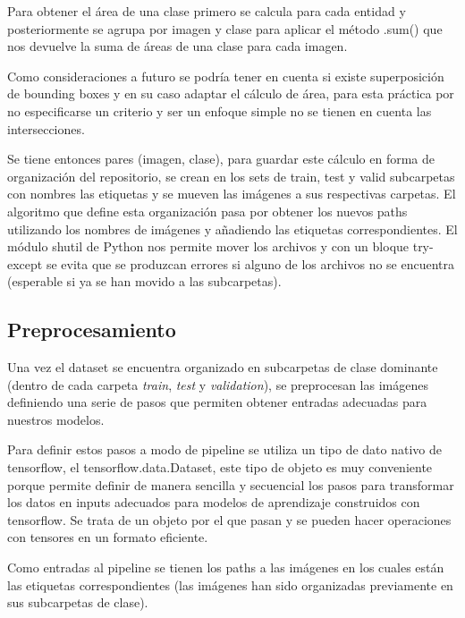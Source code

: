 \quad  

\noindent
Para obtener el área de una clase primero se calcula para cada entidad y posteriormente se agrupa por imagen y clase para aplicar el método .sum() que nos devuelve la suma de áreas de una clase para cada imagen.

\quad  

\noindent
Como consideraciones a futuro se podría tener en cuenta si existe superposición de bounding boxes y en su caso adaptar el cálculo de área, para esta práctica por no especificarse un criterio y ser un enfoque simple no se tienen en cuenta las intersecciones.

\quad  

\noindent
Se tiene entonces pares (imagen, clase), para guardar este cálculo en forma de organización del repositorio, se crean en los sets de train, test y valid subcarpetas con nombres las etiquetas y se mueven las imágenes a sus respectivas carpetas. El algoritmo que define esta organización pasa por obtener los nuevos paths utilizando los nombres de imágenes y añadiendo las etiquetas correspondientes. El módulo shutil de Python nos permite mover los archivos y con un bloque try-except se evita que se produzcan errores si alguno de los archivos no se encuentra (esperable si ya se han movido a las subcarpetas).

\subsection{Preprocesamiento}

\noindent
Una vez el dataset se encuentra organizado en subcarpetas de clase dominante (dentro de cada carpeta \textit{train}, \textit{test} y \textit{validation}), se preprocesan las imágenes definiendo una serie de pasos que permiten obtener entradas adecuadas para nuestros modelos.

Para definir estos pasos a modo de pipeline se utiliza un tipo de dato nativo de tensorflow, el tensorflow.data.Dataset, este tipo de objeto es muy conveniente porque permite definir de manera sencilla y secuencial los pasos para transformar los datos en inputs adecuados para modelos de aprendizaje construidos con tensorflow. Se trata de un objeto por el que pasan y se pueden hacer operaciones con tensores en un formato eficiente.

Como entradas al pipeline se tienen los paths a las imágenes en los cuales están las etiquetas correspondientes (las imágenes han sido organizadas previamente en sus subcarpetas de clase). 

